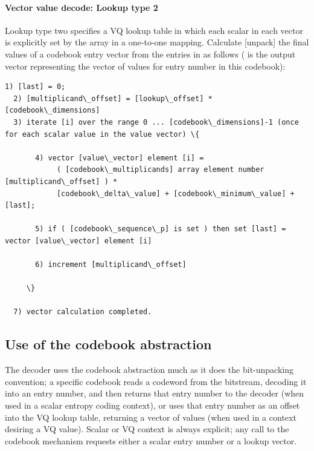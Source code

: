 \paragraph{Vector value decode: Lookup type 2}

Lookup type two specifies a VQ lookup table in which each scalar in
each vector is explicitly set by the 
array in a one-to-one mapping.  Calculate [unpack] the
final values of a codebook entry vector from the entries in
 as follows (
is the output vector representing the vector of values for entry number
 in this codebook):

\begin{Verbatim}[commandchars=\\\{\}]
  1) [last] = 0;
  2) [multiplicand\_offset] = [lookup\_offset] * [codebook\_dimensions]
  3) iterate [i] over the range 0 ... [codebook\_dimensions]-1 (once for each scalar value in the value vector) \{

       4) vector [value\_vector] element [i] =
            ( [codebook\_multiplicands] array element number [multiplicand\_offset] ) *
            [codebook\_delta\_value] + [codebook\_minimum\_value] + [last];

       5) if ( [codebook\_sequence\_p] is set ) then set [last] = vector [value\_vector] element [i]

       6) increment [multiplicand\_offset]

     \}

  7) vector calculation completed.
\end{Verbatim}









\subsection{Use of the codebook abstraction}

The decoder uses the codebook abstraction much as it does the
bit-unpacking convention; a specific codebook reads a
codeword from the bitstream, decoding it into an entry number, and then
returns that entry number to the decoder (when used in a scalar
entropy coding context), or uses that entry number as an offset into
the VQ lookup table, returning a vector of values (when used in a context
desiring a VQ value). Scalar or VQ context is always explicit; any call
to the codebook mechanism requests either a scalar entry number or a
lookup vector.

